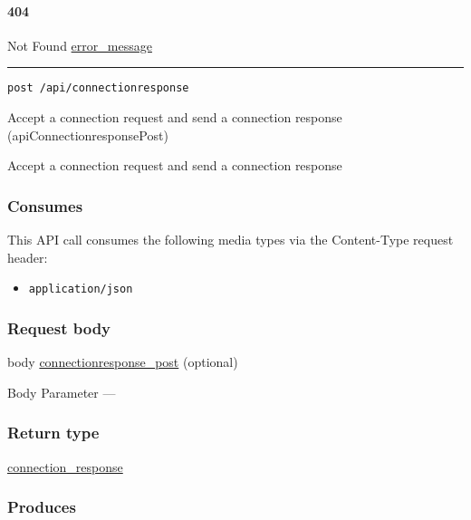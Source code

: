 \hypertarget{section-88}{%
\paragraph{404}\label{section-88}}

Not Found \protect\hyperlink{error_message}{error\_message}

\begin{center}\rule{0.5\linewidth}{\linethickness}\end{center}

\protect\hypertarget{apiConnectionresponsePost}{}{}

\begin{verbatim}
post /api/connectionresponse
\end{verbatim}

Accept a connection request and send a connection response
({apiConnectionresponsePost})

Accept a connection request and send a connection response

\hypertarget{consumes-8}{%
\subsubsection{Consumes}\label{consumes-8}}

This API call consumes the following media types via the {Content-Type}
request header:

\begin{itemize}
\tightlist
\item
  \texttt{application/json}
\end{itemize}

\hypertarget{request-body-8}{%
\subsubsection{Request body}\label{request-body-8}}

body
\protect\hyperlink{connectionresponse_post}{connectionresponse\_post}
(optional)

{Body Parameter} ---

\hypertarget{return-type-21}{%
\subsubsection{Return type}\label{return-type-21}}

\protect\hyperlink{connection_response}{connection\_response}

\hypertarget{produces-27}{%
\subsubsection{Produces}\label{produces-27}}

